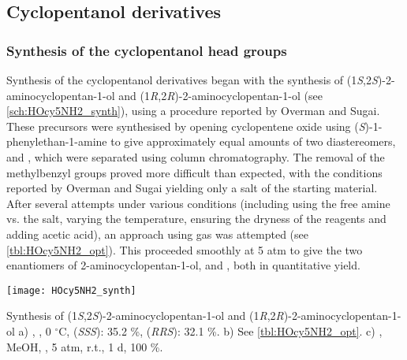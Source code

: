 \subsection{Cyclopentanol derivatives}

\subsubsection{Synthesis of the cyclopentanol head groups }

Synthesis of the cyclopentanol derivatives began with the synthesis of (1\textit{S},2\textit{S})-2-aminocyclopentan-1-ol  and (1\textit{R},2\textit{R})-2-aminocyclopentan-1-ol  (see \ref{sch:HOcy5NH2_synth}), using a procedure reported by Overman and Sugai\cite{Aube1992,Overman1985,Overman1985a}.
These precursors were synthesised by opening cyclopentene oxide  using (\textit{S})-1-phenylethan-1-amine  to give approximately equal amounts of two diastereomers,  and , which were separated using column chromatography. 
The removal of the methylbenzyl groups proved more difficult than expected, with the conditions reported by Overman and Sugai\cite{Overman1985} yielding only a salt of the starting material.
After several attempts under various conditions (including using the free amine vs. the salt, varying the temperature, ensuring the dryness of the reagents and adding acetic acid), an approach using  gas was attempted (see \ref{tbl:HOcy5NH2_opt}). This proceeded smoothly at 5 atm to give the two enantiomers of 2-aminocyclopentan-1-ol,  and , both in quantitative yield.

\begin{scheme}[H]
	\begin{center}
		\texttt{[image: HOcy5NH2\_synth]}
		\caption{Synthesis of (1\textit{S},2\textit{S})-2-aminocyclopentan-1-ol  and (1\textit{R},2\textit{R})-2-aminocyclopentan-1-ol 
		a) , , 0 $^\circ$C,  
		 (\textit{SSS}): 35.2 \%,
		 (\textit{RRS}): 32.1 \%.
		b) See \ref{tbl:HOcy5NH2_opt}.
		c) , MeOH, , 5 atm, r.t., 1 d, 100 \%.
		\label{sch:HOcy5NH2_synth}}
	\end{center}
\end{scheme}


